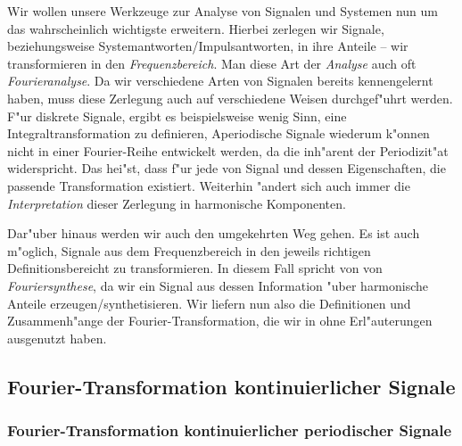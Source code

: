 Wir wollen unsere Werkzeuge zur Analyse von Signalen und Systemen nun um das wahrscheinlich wichtigste erweitern.
Hierbei zerlegen wir Signale, beziehungsweise Systemantworten/Impulsantworten, in ihre  Anteile -- wir transformieren in den \emph{Frequenzbereich}.
Man diese Art der \emph{Analyse} auch oft \emph{Fourieranalyse}.
Da wir verschiedene Arten von Signalen bereits kennengelernt haben, muss diese Zerlegung auch auf verschiedene Weisen durchgef"uhrt werden.
F"ur diskrete Signale, ergibt es beispielsweise wenig Sinn, eine Integraltransformation zu definieren, Aperiodische Signale wiederum k"onnen nicht in einer Fourier-Reihe entwickelt werden, da die inh"arent der Periodizit"at widerspricht.
Das hei"st, dass f"ur jede  von Signal und dessen Eigenschaften, die passende Transformation existiert.
Weiterhin "andert sich auch immer die \emph{Interpretation} dieser Zerlegung in harmonische Komponenten.

Dar"uber hinaus werden wir auch den umgekehrten Weg gehen.
Es ist auch m"oglich, Signale aus dem Frequenzbereich in den jeweils richtigen Definitionsbereicht zu transformieren. 
In diesem Fall spricht von von \emph{Fouriersynthese}, da wir ein Signal aus dessen Information "uber harmonische Anteile erzeugen/synthetisieren.
Wir liefern nun also die Definitionen und Zusammenh"ange der Fourier-Transformation, die wir in  ohne Erl"auterungen ausgenutzt haben.

\subsection{Fourier-Transformation kontinuierlicher Signale}\label{sec:fourier:cont}

\subsubsection{Fourier-Transformation kontinuierlicher periodischer Signale}\label{sec:fourier:cont:period}

